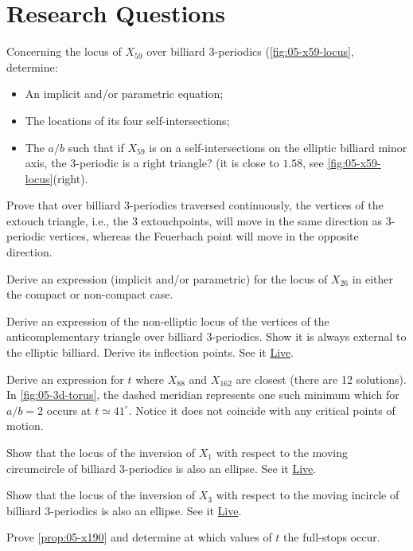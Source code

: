 \section{Research Questions}

\begin{question}
Concerning the locus of $X_{59}$ over billiard 3-periodics (\cref{fig:05-x59-locus}, determine:
\begin{itemize}
\item An implicit and/or parametric equation;
\item The locations of its four self-intersections;
\item The $a/b$ such that if $X_{59}$ is on a self-intersections on the elliptic billiard minor axis, the 3-periodic is a right triangle? (it is close to $1.58$, see \cref{fig:05-x59-locus}(right).
\end{itemize}
\end{question}

\begin{question}
Prove that over billiard 3-periodics traversed continuously, the vertices of the extouch triangle, i.e., the 3 extouchpoints, will move in the same direction as 3-periodic vertices, whereas the Feuerbach point will move in the opposite direction.  
\end{question}

\begin{question}
Derive an expression (implicit and/or parametric) for the locus of $X_{26}$ in either the compact or non-compact case.
\end{question}

\begin{question}
Derive an expression of the non-elliptic locus of the vertices of the anticomplementary triangle over billiard 3-periodics. Show it is always external to the elliptic billiard. Derive its inflection points. See it \href{https://bit.ly/2RtUT00}{Live}.
\end{question}

\begin{question}
\label{que:05-x88-x162}
Derive an expression for $t$ where $X_{88}$ and $X_{162}$ are closest (there are 12 solutions). In \cref{fig:05-3d-torus}, the dashed meridian represents one such minimum which for $a/b=2$ occurs at $t{\simeq}41^\circ$. Notice it does not coincide with any critical points of motion.
\end{question}

\begin{question}
Show that the locus of the inversion of $X_1$ with respect to the moving circumcircle of billiard 3-periodics is also an ellipse. See it \href{https://bit.ly/3ujusan}{Live}.
\end{question}

\begin{question}
Show that the locus of the inversion of $X_3$ with respect to the moving incircle of billiard 3-periodics is also an ellipse. See it \href{https://bit.ly/2SwDLa4}{Live}.
\end{question}

\begin{question}
Prove \cref{prop:05-x190} and determine at which values of $t$ the full-stops occur.
\end{question}